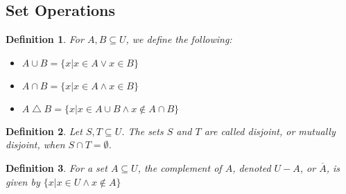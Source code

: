 \documentclass[12pt]{article}
\newtheorem{definition}{Definition} [section]
\begin{document}
\subsection{Set Operations}
\begin{definition} \emph{For $A, B \subseteq U$, we define the following:}
\begin{itemize}
\item $A \cup B = \{x|x \in A \vee x \in B\}$
\item $A \cap B = \{x|x \in A \wedge x \in B\}$
\item $A \bigtriangleup B = \{x|x \in A \cup B \wedge x \notin A \cap B\}$
\end{itemize}
\end{definition}
\begin{definition}\emph{Let $S, T \subseteq U$. The sets $S$ and $T$ are called }disjoint, \emph{or }mutually disjoint, \emph{when $S \cap T = \emptyset$.}\end{definition}
\begin{definition}\emph{For a set $A \subseteq U$, the }complement \emph{of $A$, denoted $U-A$, or $\overline{A}$, is given by $\{x|x\in U \wedge x \notin A\}$}\end{definition}
\end{document}
